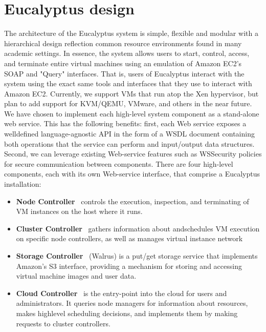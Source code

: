 \section{Eucalyptus design}
The architecture of the Eucalyptus system is simple, flexible and modular with a hierarchical design reflection common resource
environments found in many academic settings. In essence, the system allows users to start, control, access, and terminate entire 
virtual machines using an emulation of Amazon EC2's SOAP and "Query" interfaces. That is, users of Eucalyptus interact with the system 
using the exact same tools and interfaces that they use to interact with Amazon EC2. Currently, we support VMs that run atop the Xen 
hypervisor, but plan to add support for KVM/QEMU, VMware, and others in the near future.\\
We have chosen to implement each high-level system component as a stand-alone web service. This has the following benefits: first, each 
Web service exposes a welldefined language-agnostic API in the form of a WSDL document containing both operations that the service can 
perform and input/output data structures. Second, we can leverage existing Web-service features such as WSSecurity policies for secure 
communication between components. There are four high-level components, each with its own Web-service interface, that comprise a 
Eucalyptus installation:
\begin{itemize}
  \item {\bf Node Controller} \textendash\ controls the execution, inspection, and terminating of VM instances on the host 
  where it runs.
  \item {\bf Cluster Controller} \textendash\ gathers information about andschedules VM execution on specific node controllers, 
  as well as manages virtual instance network
  \item {\bf Storage Controller} \textendash\ (Walrus) is a put/get storage service that implements Amazon’s S3 interface, providing 
  a mechanism for storing and accessing virtual machine images and user data.
  \item {\bf Cloud Controller} \textendash\ is the entry-point into the cloud for users and administrators. It queries node managers 
  for information about resources, makes highlevel scheduling decisions, and implements them by making requests to cluster controllers.
\end{itemize}
